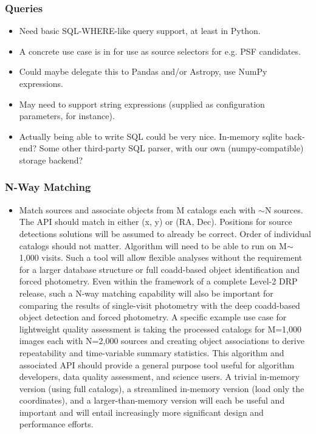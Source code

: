 \subsubsection{Queries}
\label{sec:spTablesQueries}

\begin{itemize}
\item Need basic SQL-WHERE-like query support, at least in Python.
\item A concrete use case is in for use as source selectors for e.g. PSF candidates.
\item Could maybe delegate this to Pandas and/or Astropy, use NumPy expressions.
\item May need to support string expressions (supplied as configuration parameters, for instance).
\item Actually being able to write SQL could be very nice.  In-memory sqlite back-end?  Some other third-party SQL parser, with our own (numpy-compatible) storage backend?
\end{itemize}

\subsubsection{N-Way Matching}
\label{sec:spTablesNWayMatching}

\begin{itemize}
\item Match sources and associate objects from M catalogs each with $\sim$N sources.  The API should match in either (x, y) or (RA, Dec).  Positions for source detections solutions will be assumed to already be correct.  Order of individual catalogs should not matter.  Algorithm will need to be able to run on M$\sim$1,000 visits.  Such a tool will allow flexible analyses without the requirement for a larger database structure or full coadd-based object identification and forced photometry.  Even within the framework of a complete Level-2 DRP release, such a N-way matching capability will also be important for comparing the results of single-visit photometry with the deep coadd-based object detection and forced photometry.  A specific example use case for lightweight quality assessment is taking the processed catalogs for M=1,000 images each with N=2,000 sources and creating object associations to derive repeatability and time-variable summary statistics.  This algorithm and associated API should provide a general purpose tool useful for algorithm developers, data quality assessment, and science users.  A trivial in-memory version (using full catalogs), a streamlined in-memory version (load only the coordinates), and a larger-than-memory version will each be useful and important and will entail increasingly more significant design and performance efforts.
\end{itemize}


